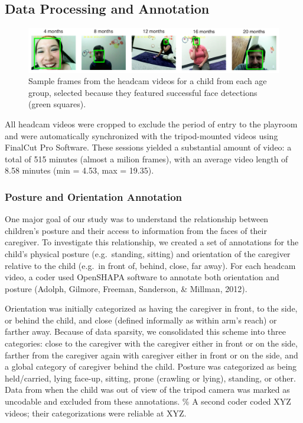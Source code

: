 \documentclass[a4paper,man,apacite,floatsintext,longtable]{apa6}
\begin{document}
\subsection{Data Processing and
Annotation}\label{data-processing-and-annotation}

\begin{figure}
\includegraphics[width=6in]{images/framesample.pdf}
\caption{\label{fig:frames} Sample frames from the headcam videos for a child from each age group, selected because they featured successful face detections (green squares).}
\end{figure}

All headcam videos were cropped to exclude the period of entry to the
playroom and were automatically synchronized with the tripod-mounted
videos using FinalCut Pro Software. These sessions yielded a substantial
amount of video: a total of 515 minutes (almost a milion frames), with
an average video length of 8.58 minutes (min = 4.53, max = 19.35).

\subsubsection{Posture and Orientation
Annotation}\label{posture-and-orientation-annotation}

One major goal of our study was to understand the relationship between
children's posture and their access to information from the faces of
their caregiver. To investigate this relationship, we created a set of
annotations for the child's physical posture (e.g.~standing, sitting)
and orientation of the caregiver relative to the child (e.g.~in front
of, behind, close, far away). For each headcam video, a coder used
OpenSHAPA software to annotate both orientation and posture (Adolph,
Gilmore, Freeman, Sanderson, \& Millman, 2012).

Orientation was initially categorized as having the caregiver in front,
to the side, or behind the child, and close (defined informally as
within arm's reach) or farther away. Because of data sparsity, we
consolidated this scheme into three categories: close to the caregiver
with the caregiver either in front or on the side, farther from the
caregiver again with caregiver either in front or on the side, and a
global category of caregiver behind the child. Posture was categorized
as being held/carried, lying face-up, sitting, prone (crawling or
lying), standing, or other. Data from when the child was out of view of
the tripod camera was marked as uncodable and excluded from these
annotations. \% A second coder coded XYZ videos; their categorizations
were reliable at XYZ.
\end{document}
